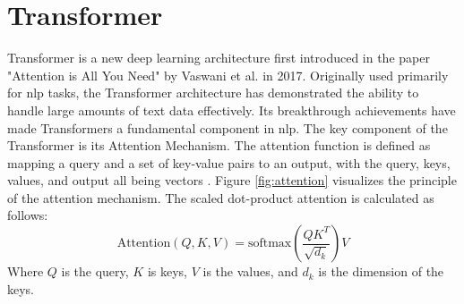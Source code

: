\section{Transformer}
\label{transformer}
Transformer is a new deep learning architecture first introduced in the paper "Attention is All You Need" by Vaswani et al. \cite{vaswani_attention_2023} in 2017. Originally used primarily for \gls{nlp} tasks, the Transformer architecture has demonstrated the ability to handle large amounts of text data effectively. Its breakthrough achievements have made Transformers a fundamental component in \gls{nlp}. The key component of the Transformer is its Attention Mechanism. The attention function is defined as mapping a query and a set of key-value pairs to an output, with the query, keys, values, and output all being vectors \cite{vaswani_attention_2023}. Figure \ref{fig:attention} visualizes the principle of the attention mechanism. The scaled dot-product attention is calculated as follows:
\begin{equation}
\text{Attention}(Q, K, V) = \text{softmax}\left(\frac{QK^T}{\sqrt{d_k}}\right) V
\end{equation}
Where $Q$ is the query, $K$ is keys, $V$ is the values, and $d_k$ is the dimension of the keys.
